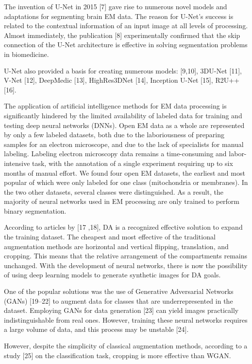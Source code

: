 \documentclass[journal,article,submit,pdftex,moreauthors]{Definitions/mdpi}
\begin{document}
The invention of U-Net in 2015 [7] gave rise to numerous novel models and adaptations for segmenting brain EM data. The reason for U-Net’s success is related to the contextual information of an input image at all levels of processing. Almost immediately, the publication [8] experimentally confirmed that the skip connection of the U-Net architecture is effective in solving segmentation problems in biomedicine.

U-Net also provided a basis for creating numerous models: [9,10], 3DU-Net [11], V-Net [12], DeepMedic [13], HighRes3DNet [14], Inception U-Net [15], R2U++ [16].

The application of artificial intelligence methods for EM data processing is significantly hindered by the limited availability of labeled data for training and testing deep neural networks (DNNs). Open EM data as a whole are represented by only a few labeled datasets, both due to the laboriousness of preparing samples for an electron microscope, and due to the lack of specialists for manual labeling. Labeling electron microscopy data remains a time-consuming and labor-intensive task, with the annotation of a single experiment requiring up to six months of manual effort. We found four open EM datasets, the earliest and most popular of which were only labeled for one class (mitochondria or membranes). In the two other datasets, several classes were distinguished. As a result, the majority of neural networks used in EM processing are only trained to perform binary segmentation.

According to articles by [17 ,18], DA is a recognized effective solution to expand the training dataset. The cheapest and most effective of the traditional augmentation methods are horizontal and vertical flipping, translation, and cropping. This means that the relative arrangement of the compartments remains unchanged. With the development of neural networks, there is now the possibility of using deep learning models to generate synthetic images for DA goals.

One of the popular solutions was the use of Generative Adversarial Networks (GANs) [19–22] to augment data for classes that are underrepresented in the dataset. Employing GANs for data generation [23] can yield images practically indistinguishable from real ones. However, training these neural networks requires a large volume of data, and this process may be unstable [24].

However, despite the simplicity of classical augmentation methods, according to a study [25] on the classification task, cropping is more effective than WGAN.
\end{document}
